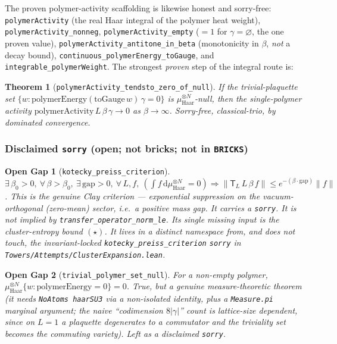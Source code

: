 \documentclass[11pt]{article}
\newtheorem{theorem}{Theorem}[section]
\newtheorem*{opengap}{Open Gap}
\newcommand{\TL}{\mathsf{T}_L}
\newcommand{\haarN}{\mu_{\mathrm{Haar}}^{\otimes N}}
\newcommand{\code}[1]{\texttt{#1}}
\begin{document}
The proven polymer-activity scaffolding is likewise honest and
sorry-free: \code{polymerActivity} (the real Haar integral of the
polymer heat weight), \code{polymerActivity\_nonneg},
\code{polymerActivity\_empty} ($=1$ for $\gamma=\varnothing$, the one
proven value), \code{polymerActivity\_antitone\_in\_beta}
(monotonicity in $\beta$, \emph{not} a decay bound),
\code{continuous\_polymerEnergy\_toGauge}, and
\code{integrable\_polymerWeight}. The strongest \emph{proven} step of
the integral route is:

\begin{theorem}[\code{polymerActivity\_tendsto\_zero\_of\_null}]
\emph{If} the trivial-plaquette set $\{w :
\mathrm{polymerEnergy}(\mathrm{toGauge}\,w)\,\gamma = 0\}$ is
$\haarN$-null, \emph{then} the single-polymer activity
$\mathrm{polymerActivity}\,L\,\beta\,\gamma \to 0$ as $\beta\to\infty$.
Sorry-free, classical-trio, by dominated convergence.
\end{theorem}

\subsubsection*{Disclaimed \code{sorry} (open; not bricks; not in \code{BRICKS})}

\begin{opengap}[\code{kotecky\_preiss\_criterion}]
$\exists\,\beta_0>0,\ \forall\,\beta>\beta_0,\ \exists\,\mathrm{gap}>0,\
\forall\,L,f,\ (\int f\,\mathrm{d}\haarN = 0)\Rightarrow
\lVert\TL\,L\,\beta\,f\rVert \le e^{-(\beta\cdot\mathrm{gap})}\lVert
f\rVert$. This is the genuine Clay criterion --- exponential
suppression on the vacuum-orthogonal (zero-mean) sector, i.e.\ a
positive mass gap. It carries a \code{sorry}. It is \emph{not}
implied by \code{transfer\_operator\_norm\_le}. Its single missing
input is the cluster-entropy bound $(\star)$. It lives in a distinct
namespace from, and does not touch, the invariant-locked
\code{kotecky\_preiss\_criterion} \code{sorry} in
\code{Towers/Attempts/ClusterExpansion.lean}.
\end{opengap}

\begin{opengap}[\code{trivial\_polymer\_set\_null}]
For a non-empty polymer, $\haarN\{w :
\mathrm{polymerEnergy}=0\}=0$. True, but a genuine measure-theoretic
theorem (it needs \code{NoAtoms haarSU3} via a non-isolated identity,
plus a \code{Measure.pi} marginal argument; the naive
``codimension $8\lvert\gamma\rvert$'' count is lattice-size
dependent, since on $L=1$ a plaquette degenerates to a commutator and
the triviality set becomes the commuting variety). Left as a
disclaimed \code{sorry}.
\end{opengap}
\end{document}
